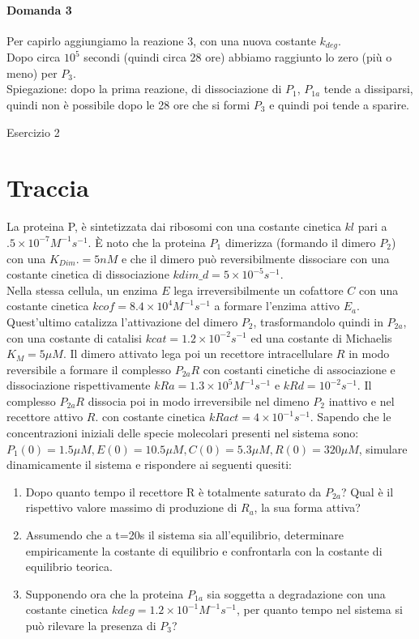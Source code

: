 \documentclass{article}
\begin{document}
\paragraph{Domanda 3}
Per capirlo aggiungiamo la reazione 3, con una nuova costante $k_{deg}$.\\
Dopo circa $10^5$ secondi (quindi circa 28 ore) abbiamo raggiunto lo zero (più o meno) per $P_3$.\\
Spiegazione: dopo la prima reazione, di dissociazione di $P_1$, $P_{1a}$ tende a dissiparsi, quindi non è possibile dopo le 28 ore che si formi $P_3$ e quindi poi tende a sparire.

\newpage
\begin{center}
   \huge
   Esercizio 2
\end{center} 

\section*{Traccia}
La proteina P, è sintetizzata dai ribosomi con una costante cinetica $kl$ pari a$ .5 \times 10^{-7} M^{-1}s^{-1}$. È noto che la proteina $P_1$ dimerizza (formando il dimero $P_2$) con una $K_{Dim}. = 5 nM$ e che il dimero può reversibilmente dissociare con una costante cinetica di dissociazione $kdim\_d = 5 \times 10^{-5}s^{-1}$.\\ Nella stessa cellula, un enzima $E$ lega irreversibilmente un cofattore $C$ con una costante cinetica $kcof = 8.4 \times 10^4 M^{-1}s^{-1}$ a formare l'enzima attivo $E_a$. 
Quest'ultimo catalizza l'attivazione del dimero $P_2$, trasformandolo quindi in $P_{2a}$, con una costante di catalisi $kcat = 1.2 \times 10^{-2}s^{-1}$ ed una costante di Michaelis $K_M = 5 \mu M$. Il dimero attivato lega poi un recettore intracellulare $R$ in modo reversibile a formare il complesso $P_{2a}R$ con costanti cinetiche di associazione e dissociazione rispettivamente $kRa = 1.3 \times 10^5 M^{-1}s^{-1}$ e $kRd =10^{-2} s^{-1}$. Il complesso $P_{2a}R$ dissocia poi in modo irreversibile nel dimeno $P_2$ inattivo e nel recettore attivo $R$. con costante cinetica $kRact = 4 \times 10^{-1}s^{-1} $. 
Sapendo che le concentrazioni iniziali delle specie molecolari presenti nel sistema sono: 
$P_1(0) = 1.5 \mu M, E(0) = 10.5 \mu M, C(0) = 5.3 \mu M, R(0) = 320 \mu M$, simulare dinamicamente il sistema e rispondere ai seguenti quesiti: 
\begin{enumerate}
   \item Dopo quanto tempo il recettore R è totalmente saturato da $P_{2a}$? Qual è il rispettivo valore massimo di produzione di $R_a$, la sua forma attiva?
   \item Assumendo che a t=20s il sistema sia all'equilibrio, determinare empiricamente la costante di equilibrio e confrontarla con la costante di equilibrio teorica.
   \item Supponendo ora che la proteina $P_{1a}$ sia soggetta a degradazione con una costante cinetica $kdeg=1.2 \times 10^{-1} M^{-1}s^{-1}$, per quanto tempo nel sistema si può rilevare la presenza di $P_3$?
\end{enumerate}
\end{document}
